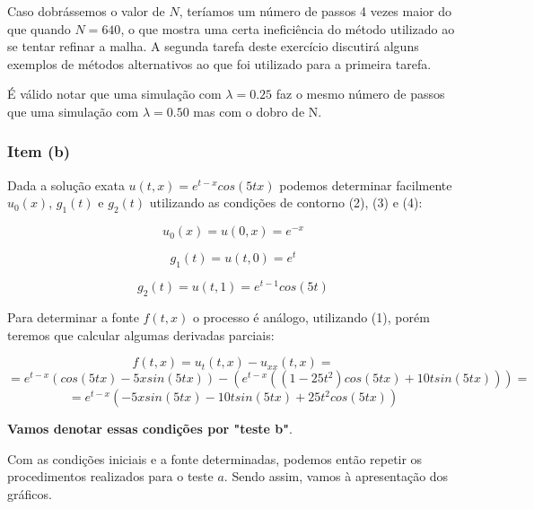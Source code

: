 \documentclass[a4paper, 12pt]{article}
\begin{document}
Caso dobrássemos o valor de $N$, teríamos um número de passos 4 vezes maior do que quando $N=640$, o que mostra uma certa ineficiência do método utilizado ao se tentar refinar a malha. A segunda tarefa deste exercício discutirá alguns exemplos de métodos alternativos ao que foi utilizado para a primeira tarefa. 

É válido notar que uma simulação com $\lambda = 0.25$ faz o mesmo número de passos que uma simulação com $\lambda = 0.50$ mas com o dobro de N.

\subsubsection{Item (b)}

Dada a solução exata $u(t,x)=e^{t-x}cos(5tx)$ podemos determinar facilmente $u_0(x)$, $g_1(t)$ e $g_2(t)$ utilizando as condições de contorno (2), (3) e (4):

$$u_0(x)=u(0,x)=e^{-x}$$

$$g_1(t)=u(t,0)=e^{t}$$

$$g_2(t)=u(t,1)=e^{t-1}cos(5t)$$

Para determinar a fonte $f(t,x)$ o processo é análogo, utilizando (1), porém teremos que calcular algumas derivadas parciais:

$$f(t,x)=u_t(t,x)-u_{xx}(t,x)=$$ $$=e^{t-x}(cos(5tx)-5xsin(5tx))-(e^{t-x}((1-25t^2)cos(5tx)+10tsin(5tx)))=$$
$$=e^{t-x}(-5xsin(5tx)-10tsin(5tx)+25t^{2}cos(5tx))$$

\textbf{Vamos denotar essas condições por "teste b"}.

Com as condições iniciais e a fonte determinadas, podemos então repetir os procedimentos realizados para o teste $a$. Sendo assim, vamos à apresentação dos gráficos.
\end{document}
